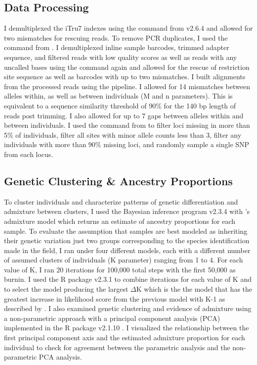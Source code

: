 \subsection{Data Processing}
I demultiplexed the iTru7 indexes using the \processradtags command from 
\stacks v2.6.4 \parencites{rochette2019} and allowed for two mismatches for rescuing reads.
To remove PCR duplicates, I used the \clonefilter command from \stacks.
I demultiplexed inline sample barcodes, trimmed adapter sequence, and filtered 
reads with low quality scores as well as reads with any uncalled bases using the  
\processradtags command again and allowed for the rescue of restriction site sequence 
as well as barcodes with up to two mismatches.  
I built alignments from the processed reads using the \stacks pipeline. 
I allowed for 14 mismatches between alleles within, as well as between individuals
(M and n parameters). This is equivalent to a sequence similarity threshold of   
90\% for the 140 bp length of reads post trimming. 
I also allowed for up to 7 gaps between alleles within and between individuals.
I used the \populations command from \stacks to filter loci missing in more than   
5\% of individuals, filter all sites with minor allele counts less than 3, filter 
any individuals with more than 90\% missing loci, and randomly sample a single
SNP from each locus.

\subsection{Genetic Clustering \& Ancestry Proportions}
To cluster individuals and characterize patterns of genetic differentiation and 
admixture between clusters, I used the Bayesian inference program 
\structure v2.3.4 \parencite{pritchard2000} with \structure's 
admixture model which returns an estimate of ancestry proportions for each sample. 
To evaluate the assumption that samples are best modeled as inheriting their    
genetic variation just two groups corresponding to the species identification  
made in the field, I ran \structure under four different models, each with a different number of 
assumed clusters of individuals (K parameter) ranging from 1 to 4. For each value of K, I 
ran 20 iterations for 100,000 total steps with the first 50,000 as burnin. 
I used the R package \pophelper v2.3.1 \parencite{francis2017} to combine
iterations for each value of K and to select the model producing the largest
$\Delta$K which is the the model that has the greatest increase in likelihood 
score from the previous model with K-1 as described by \parencite{evanno2005}.
I also examined genetic clustering and evidence of admixture using a non-parametric 
approach with a principal component analysis (PCA) implemented in the R package \adegenet v2.1.10 \parencite{jombart2008}. 
I visualized the relationship between the first principal component axis and the 
estimated admixture proportion for each individual to check for agreement  
between the parametric \structure analysis and the non-parametric PCA analysis.

